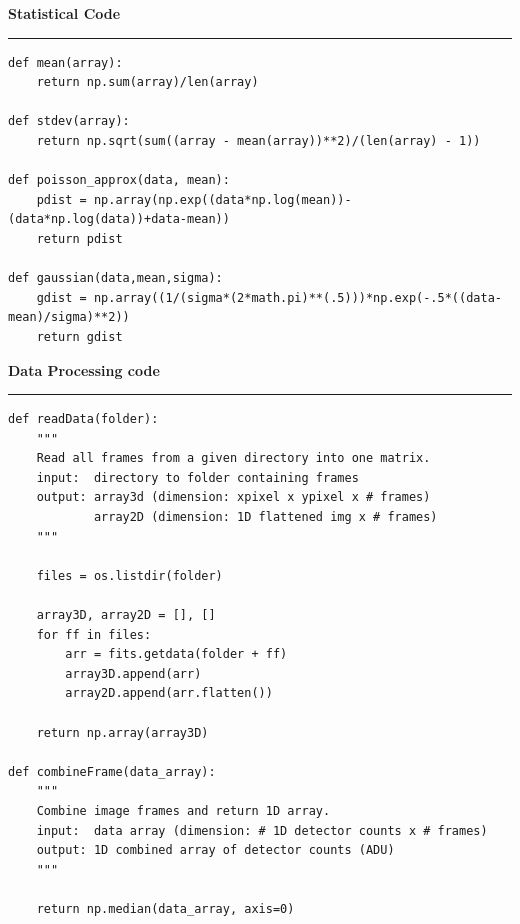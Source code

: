 \documentclass[preprint]{aastex62}
\begin{document}
\small
\textbf{Statistical Code} \label{code:stats} \\
\hrule
\begin{lstlisting}
def mean(array):
    return np.sum(array)/len(array)

def stdev(array):
    return np.sqrt(sum((array - mean(array))**2)/(len(array) - 1))

def poisson_approx(data, mean):
    pdist = np.array(np.exp((data*np.log(mean))-(data*np.log(data))+data-mean))
    return pdist

def gaussian(data,mean,sigma):
    gdist = np.array((1/(sigma*(2*math.pi)**(.5)))*np.exp(-.5*((data-mean)/sigma)**2)) 
    return gdist
\end{lstlisting}

\textbf{Data Processing code} \label{code:data} \\
\hrule
\begin{lstlisting}
def readData(folder):
    """
    Read all frames from a given directory into one matrix.
    input:  directory to folder containing frames
    output: array3d (dimension: xpixel x ypixel x # frames)
            array2D (dimension: 1D flattened img x # frames)
    """
    
    files = os.listdir(folder)

    array3D, array2D = [], []
    for ff in files:
        arr = fits.getdata(folder + ff)
        array3D.append(arr)
        array2D.append(arr.flatten())
    
    return np.array(array3D)

def combineFrame(data_array):
    """
    Combine image frames and return 1D array.
    input:  data array (dimension: # 1D detector counts x # frames)
    output: 1D combined array of detector counts (ADU)
    """
    
    return np.median(data_array, axis=0)
\end{lstlisting}
\end{document}
